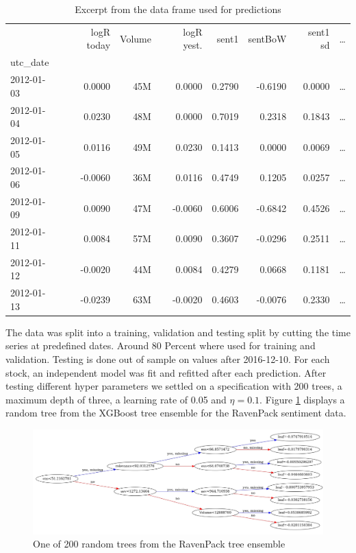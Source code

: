 \begin{table}[h]
\centering
\begin{tabular}{lrrrrrrr}
\toprule
{} &  logR today &  Volume &  logR yest. &  sent1 &  sentBoW &  sent1 sd &  \dots \\
utc\_date   &              &             &                     &             &               &           &                   \\
\midrule
2012-01-03 &       0.0000 &  45M &           0.0000 &      0.2790 &       -0.6190 &    0.0000 &         \dots \\
2012-01-04 &       0.0230 &  48M &              0.0000 &      0.7019 &        0.2318 &    0.1843 &      \dots \\
2012-01-05 &       0.0116 &  49M &              0.0230 &      0.1413 &        0.0000 &    0.0069 &      \dots \\
2012-01-06 &      -0.0060 &  36M &              0.0116 &      0.4749 &        0.1205 &    0.0257 &      \dots\\
2012-01-09 &       0.0090 &  47M &             -0.0060 &      0.6006 &       -0.6842 &    0.4526 &      \dots \\
2012-01-11 &       0.0084 &  57M &              0.0090 &      0.3607 &       -0.0296 &    0.2511 &      \dots \\
2012-01-12 &      -0.0020 &  44M &              0.0084 &      0.4279 &        0.0668 &    0.1181 &      \dots \\
2012-01-13 &      -0.0239 &  63M &             -0.0020 &      0.4603 &       -0.0076 &    0.2330 &      \dots \\
\bottomrule
\end{tabular}
    \caption{Excerpt from the data frame used for predictions}
    \label{tab:predictionFrame}
\end{table} 
The data was split into a training, validation and testing split by cutting the time series at predefined dates. Around 80 Percent where used for training and validation. Testing is done out of sample on values after 2016-12-10. For each stock, an independent model was fit and refitted after each prediction. After testing different hyper parameters we settled on a specification with 200 trees, a maximum depth of three, a learning rate of 0.05 and $\eta = 0.1$. Figure \ref{fig:tree} displays a random tree from the XGBoost tree ensemble for the RavenPack sentiment data. \\ 
\begin{figure}[h]
\centering
\includegraphics[width=\textwidth]{figures/treemodel2.jpg}
\caption{One of 200 random trees from the RavenPack tree ensemble}
\label{fig:tree}
\end{figure}

